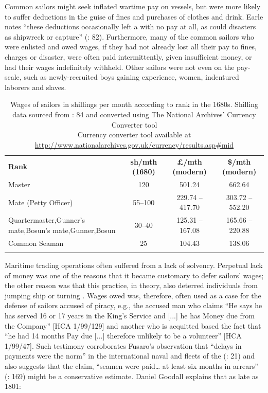 Common sailors might seek inflated wartime pay on  vessels, but were more likely to suffer deductions in the guise of fines and purchases of clothes and drink. Earle notes “these deductions occasionally left a  with no pay at all, as could disasters as shipwreck or capture” (\citeyear*{Earle1998}: 82). Furthermore, many of the common sailors who were enlisted and owed wages, if they had not already lost all their pay to fines, charges or disaster, were often paid intermittently, given insufficient money, or had their wages indefinitely withheld. Other sailors were not even on the pay-scale, such as newly-recruited boys gaining experience, women, indentured laborers and slaves. 

\begin{table}
\caption{\label{tab:key:3.2} Wages of sailors in shillings per month according to rank in the 1680s. Shilling data sourced from \citealt{Earle1998}: 84 and converted using The National Archives’ Currency Converter tool\\
Currency converter tool available at \url{http://www.nationalarchives.gov.uk/currency/results.asp\#mid}
}

\begin{tabularx}{\textwidth}{Qccc}
\lsptoprule

\textbf{Rank} & \textbf{sh/mth (1680)} & \textbf{£/mth (modern)} & \textbf{\$/mth (modern)}\\
Master & 120 & 501.24 & 662.64\\
\midrule
{Mate} (Petty Officer) & 55–100 & 229.74 – 417.70 & 303.72 – 552.20\\
\tablevspace
Quartermaster,\newline Gunner’s mate,\newline Bosun’s mate,\newline Gunner,\newline Bosun & 30–40 & 125.31 – 167.08 & 165.66 – 220.88\\
\tablevspace
Common Seaman & 25 & 104.43 & 138.06\\
\lspbottomrule
\end{tabularx}\end{table} 

Maritime trading operations often suffered from a lack of solvency. Perpetual lack of money was one of the reasons that it became customary to defer sailors’ wages; the other reason was that this practice, in theory, also deterred individuals from jumping ship or turning . Wages owed was, therefore, often used as a case for the defense of sailors accused of piracy, e.g., the accused man who claims “He says he has served 16 or 17 years in the King’s Service and [...] he has Money due from the Company” [HCA 1/99/129] and another who is acquitted based the fact that “he had 14 months Pay due [...] therefore unlikely to be a volunteer” [HCA 1/99/47]. Such testimony corroborates Fusaro’s observation that “delays in payments were the norm” in the international naval and  fleets of the  (\citeyear*{Fusaro2015}: 21) and also suggests that the claim, “seamen were paid… at least six months in arrears” (\citealt{AdkinsAdkins2008}: 169) might be a conservative estimate. Daniel Goodall explains that as late as 1801:

